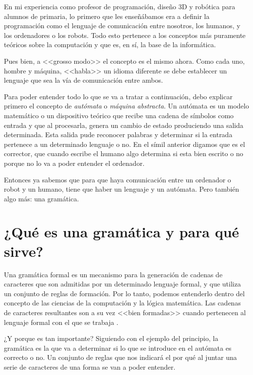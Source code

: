 
En mi experiencia como profesor de programación, diseño 3D y robótica para alumnos de primaria, lo primero que les enseñábamos era a definir la programación como el lenguaje de comunicación entre nosotros, los humanos, y los ordenadores o los robots. Todo esto pertenece a los conceptos más puramente teóricos sobre la computación y que es, en sí, la base de la informática. 

Pues bien, a <<grosso modo>> el concepto es el mismo ahora. Como cada uno, hombre y máquina, <<habla>> un idioma diferente se debe establecer un lenguaje que sea la vía de comunicación entre ambos. 

Para poder entender todo lo que se va a tratar a continuación, debo explicar primero el concepto de \textit{autómata} o \textit{máquina abstracta}. Un autómata es un modelo matemático o un dispositivo teórico que recibe una cadena de símbolos como entrada y que al procesarla, genera un cambio de estado produciendo una salida determinada. Esta salida pude reconocer palabras y determinar si la entrada pertenece a un determinado lenguaje o no. En el símil anterior digamos que es el corrector, que cuando escribe el humano algo determina si esta bien escrito o no porque no lo va a poder entender el ordenador. 

Entonces ya sabemos que para que haya comunicación entre un ordenador o robot y un humano, tiene que haber un lenguaje y un autómata. Pero también algo más: una gramática.

\section{¿Qué es una gramática y para qué sirve?}

Una gramática formal es un mecanismo para la generación de cadenas de caracteres que son admitidas por un determinado lenguaje formal, y que utiliza un conjunto de reglas de formación. Por lo tanto, podemos entenderlo dentro del concepto de las ciencias de la computación y la lógica matemática. Las cadenas de caracteres resultantes son a su vez <<bien formadas>> cuando pertenecen al lenguaje formal con el que se trabaja \cite{aho1986compilers}.

¿Y porque es tan importante? Siguiendo con el ejemplo del principio, la gramática es la que va a determinar si lo que se introduce en el autómata es correcto o no. Un conjunto de reglas que nos indicará el por qué al juntar una serie de caracteres de una forma se van a poder entender.

